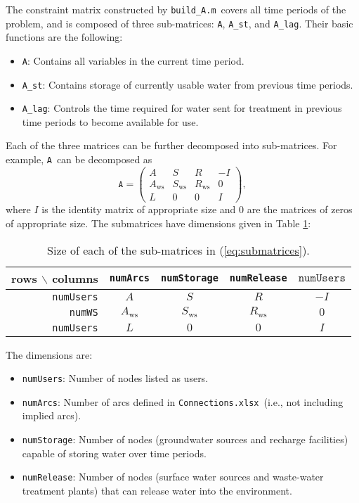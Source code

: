 \documentclass[11pt]{article}
\newcommand{\connections}{\texttt{Connections.xlsx}}
\newcommand{\buildA}{\texttt{build\_A.m}}
\newcommand{\A}{\texttt{A}}
\newcommand{\Ast}{\texttt{A\_st}}
\newcommand{\Alag}{\texttt{A\_lag}}
\newcommand{\numUsers}{\texttt{numUsers}}
\newcommand{\numArcs}{\texttt{numArcs}}
\newcommand{\numStorage}{\texttt{numStorage}}
\newcommand{\numRelease}{\texttt{numRelease}}
\newcommand{\numWS}{\texttt{numWS}}
\begin{document}
The constraint matrix constructed by \buildA\ covers all time periods of the problem, and is composed of three sub-matrices: \A, \Ast, and \Alag.
Their basic functions are the following:
\begin{itemize}
	\item \A: Contains all variables in the current time period.
	\item \Ast: Contains storage of currently usable water from previous time periods.
	\item \Alag: Controls the time required for water sent for treatment in previous time periods to become available for use.
\end{itemize}

Each of the three matrices can be further decomposed into sub-matrices.
For example, \A\ can be decomposed as
\begin{equation}
	\A = 
	\left(
	\begin{array}{cccc}
		A &   S & R   & -I \\
		A_\text{ws} & S_\text{ws} & R_\text{ws} &  0 \\
		L &   0 & 0   &  I
	\end{array}
	\right),
	\label{eq:submatrices}
\end{equation}
where $I$ is the identity matrix of appropriate size and $0$ are the matrices of zeros of appropriate size.
The submatrices have dimensions given in Table \ref{tb:submatrices}:
\begin{table}[!h]
	\centering
	\begin{tabular}{|r|c|c|c|c|}
		\hline
		rows $\backslash$ columns& \numArcs & \numStorage & \numRelease & $\numUsers$ \\
		\hline
		\numUsers & $A$           & $S$           & $R$           & $-I$ \\
		\numWS       & $A_\text{ws}$ & $S_\text{ws}$ & $R_\text{ws}$ & $0$  \\
		\numUsers & $L$           & $0$           & $0$           & $I$  \\
		\hline
	\end{tabular}
	\caption{
		Size of each of the sub-matrices in (\ref{eq:submatrices}).
	}
	\label{tb:submatrices}
\end{table}

The dimensions are:
\begin{itemize}
	\item \numUsers: Number of nodes listed as users.
	\item \numArcs: Number of arcs defined in \connections\ (i.e., not including implied arcs).
	\item \numStorage: Number of nodes (groundwater sources and recharge facilities) capable of storing water over time periods.
	\item \numRelease: Number of nodes (surface water sources and waste-water treatment plants) that can release water into the environment.
\end{itemize}
\end{document}

